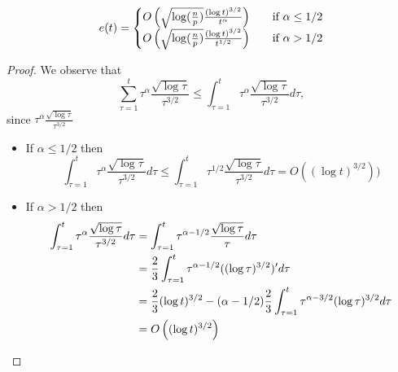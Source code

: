 \begin{lemma}
  \[
    e(t) =
    \begin{cases}
      O\left(\sqrt{\log(\frac{n}{p})}\frac{(\log t)^{3/2}}{t^\alpha}\right)
      &\quad\text{if } \alpha \leq 1/2\\
      O\left(\sqrt{\log(\frac{n}{p})}\frac{(\log t)^{3/2}}{t^{1/2}}\right)
      &\quad\text{if } \alpha > 1/2\\
    \end{cases}
  \]

\end{lemma}
\begin{proof}
  We observe that
  \[
    \sum_{\tau=1}^t\tau^\alpha
    \frac{\sqrt{\log \tau}}{\tau^{3/2}}
    \leq
    \int_{\tau=1}^t
    \tau^\alpha\frac{\sqrt{\log \tau}}{\tau^{3/2}}d\tau,
  \]
  since $\tau^\alpha\frac{\sqrt{\log \tau}}{\tau^{3/2}}$
  \begin{itemize}
    \item If
  $\alpha\leq 1/2$ then
  \[
    \int_{\tau=1}^t \tau^\alpha\frac{\sqrt{\log \tau}}{\tau^{3/2}}d\tau
    \leq
    \int_{\tau=1}^t
    \tau^{1/2}\frac{\sqrt{\log \tau}}{\tau^{3/2}}d\tau = O((\log t)^{3/2}))
  \]
\item If $\alpha> 1/2$ then\\
  \begin{align*}
    \int_{\tau=1}^t
    \tau^\alpha\frac{\sqrt{\log \tau}}{\tau^{3/2}}d\tau
    &=
    \int_{\tau=1}^t \tau^{\alpha-1/2}\frac{\sqrt{\log \tau}}{\tau}d\tau \\
    &=
    \frac{2}{3} \int_{\tau=1}^t
    \tau^{\alpha-1/2}((\log \tau)^{3/2})'d\tau \\
    &=
    \frac{2}{3}(\log t)^{3/2} - (\alpha-1/2)\frac{2}{3}
    \int_{\tau=1}^t \tau^{\alpha-3/2}(\log \tau)^{3/2}d\tau \\
    &=
    O\left((\log t)^{3/2}\right)
  \end{align*}

\end{itemize}


\end{proof}
